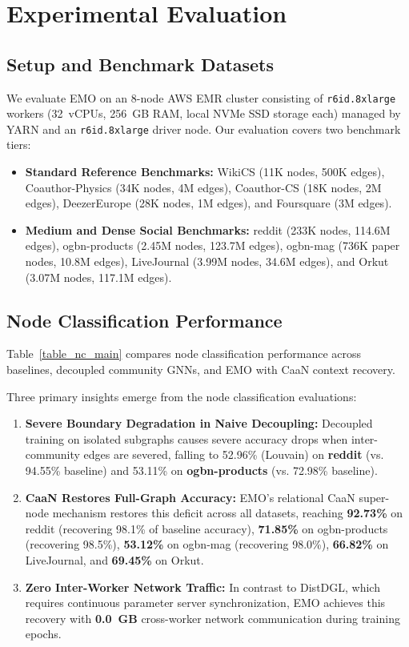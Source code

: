 \documentclass[conference,compsoc]{IEEEtran}
\begin{document}
\section{Experimental Evaluation}
\label{sec:experiments}

\subsection{Setup and Benchmark Datasets}
We evaluate EMO on an 8-node AWS EMR cluster consisting of \texttt{r6id.8xlarge} workers (32~vCPUs, 256~GB RAM, local NVMe SSD storage each) managed by YARN and an \texttt{r6id.8xlarge} driver node. Our evaluation covers two benchmark tiers:
\begin{itemize}
    \item \textbf{Standard Reference Benchmarks:} WikiCS (11K nodes, 500K edges), Coauthor-Physics (34K nodes, 4M edges), Coauthor-CS (18K nodes, 2M edges), DeezerEurope (28K nodes, 1M edges), and Foursquare (3M edges).
    \item \textbf{Medium and Dense Social Benchmarks:} reddit (233K nodes, 114.6M edges), ogbn-products (2.45M nodes, 123.7M edges), ogbn-mag (736K paper nodes, 10.8M edges), LiveJournal (3.99M nodes, 34.6M edges), and Orkut (3.07M nodes, 117.1M edges).
\end{itemize}

\subsection{Node Classification Performance}
Table~\ref{table_nc_main} compares node classification performance across baselines, decoupled community GNNs, and EMO with CaaN context recovery.



Three primary insights emerge from the node classification evaluations:
\begin{enumerate}
    \item \textbf{Severe Boundary Degradation in Naive Decoupling:} Decoupled training on isolated subgraphs causes severe accuracy drops when inter-community edges are severed, falling to 52.96\% (Louvain) on \textbf{reddit} (vs. 94.55\% baseline) and 53.11\% on \textbf{ogbn-products} (vs. 72.98\% baseline).
    \item \textbf{CaaN Restores Full-Graph Accuracy:} EMO's relational CaaN super-node mechanism restores this deficit across all datasets, reaching \textbf{92.73\%} on reddit (recovering 98.1\% of baseline accuracy), \textbf{71.85\%} on ogbn-products (recovering 98.5\%), \textbf{53.12\%} on ogbn-mag (recovering 98.0\%), \textbf{66.82\%} on LiveJournal, and \textbf{69.45\%} on Orkut.
    \item \textbf{Zero Inter-Worker Network Traffic:} In contrast to DistDGL, which requires continuous parameter server synchronization, EMO achieves this recovery with \textbf{0.0~GB} cross-worker network communication during training epochs.
\end{enumerate}
\end{document}
